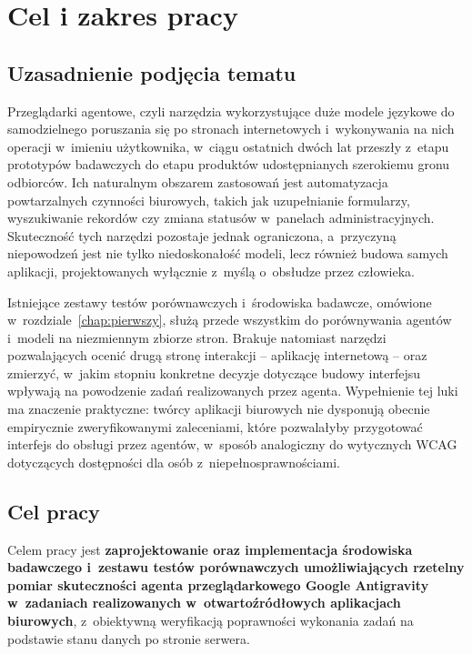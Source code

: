 \section*{Cel i zakres pracy}
\label{chap:cel}

\subsection*{Uzasadnienie podjęcia tematu}
Przeglądarki agentowe, czyli narzędzia wykorzystujące duże modele językowe do samodzielnego poruszania się po stronach internetowych i~wykonywania na nich operacji w~imieniu użytkownika, w~ciągu ostatnich dwóch lat przeszły z~etapu prototypów badawczych do etapu produktów udostępnianych szerokiemu gronu odbiorców. Ich naturalnym obszarem zastosowań jest automatyzacja powtarzalnych czynności biurowych, takich jak uzupełnianie formularzy, wyszukiwanie rekordów czy zmiana statusów w~panelach administracyjnych. Skuteczność tych narzędzi pozostaje jednak ograniczona, a~przyczyną niepowodzeń jest nie tylko niedoskonałość modeli, lecz również budowa samych aplikacji, projektowanych wyłącznie z~myślą o~obsłudze przez człowieka.

Istniejące zestawy testów porównawczych i~środowiska badawcze, omówione w~rozdziale~\ref{chap:pierwszy}, służą przede wszystkim do porównywania agentów i~modeli na niezmiennym zbiorze stron. Brakuje natomiast narzędzi pozwalających ocenić drugą stronę interakcji -- aplikację internetową -- oraz zmierzyć, w~jakim stopniu konkretne decyzje dotyczące budowy interfejsu wpływają na powodzenie zadań realizowanych przez agenta. Wypełnienie tej luki ma znaczenie praktyczne: twórcy aplikacji biurowych nie dysponują obecnie empirycznie zweryfikowanymi zaleceniami, które pozwalałyby przygotować interfejs do obsługi przez agentów, w~sposób analogiczny do wytycznych WCAG dotyczących dostępności dla osób z~niepełnosprawnościami.

\subsection*{Cel pracy}
Celem pracy jest \textbf{zaprojektowanie oraz implementacja środowiska badawczego i~zestawu testów porównawczych umożliwiających rzetelny pomiar skuteczności agenta przeglądarkowego Google Antigravity w~zadaniach realizowanych w~otwartoźródłowych aplikacjach biurowych}, z~obiektywną weryfikacją poprawności wykonania zadań na podstawie stanu danych po stronie serwera.

